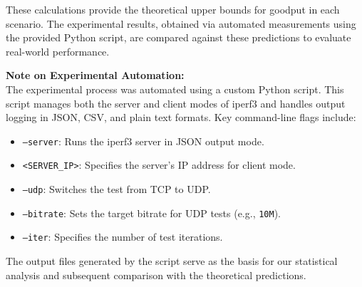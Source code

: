        These calculations provide the theoretical upper bounds for goodput in each scenario. 
        The experimental results, obtained via automated measurements using the provided Python script, are compared against these predictions to evaluate real-world performance.

        \medskip

        \noindent \textbf{Note on Experimental Automation:} \\
        The experimental process was automated using a custom Python script. This script manages both the server and client modes of iperf3 and handles output logging in JSON, CSV, and plain text formats. 
        Key command-line flags include:

        \begin{itemize}
            \item \texttt{--server}: Runs the iperf3 server in JSON output mode.
            \item \texttt{<SERVER\_IP>}: Specifies the server's IP address for client mode.
            \item \texttt{--udp}: Switches the test from TCP to UDP.
            \item \texttt{--bitrate}: Sets the target bitrate for UDP tests (e.g., \texttt{10M}).
            \item \texttt{--iter}: Specifies the number of test iterations.
        \end{itemize}

        The output files generated by the script serve as the basis for our statistical analysis and subsequent comparison with the theoretical predictions.
